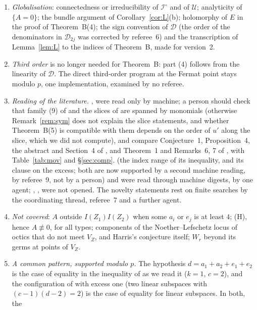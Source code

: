 \documentclass[11pt]{article}
\numberwithin{equation}{section}
\theoremstyle{remark}
\newcommand{\VZ}{V_Z}
\newcommand{\cD}{\mathcal{D}}
\newcommand{\cI}{\mathcal{I}}
\begin{document}
\begin{enumerate}[label=\textup{(\arabic*)}]
longer needed for $A\not\equiv0$, but the exact runs, the Lean certificate and all runs modulo $p$ depend on it.
No referee re-ran the exact programs or recompiled the Lean files.
\item \emph{Globalisation}: connectedness or irreducibility of $\cI^\circ$ and of $\mathcal U$; analyticity of
$\{A=0\}$; the bundle argument of Corollary~\ref{cor:L}(b); holomorphy of $E$ in the proof of Theorem~B(4); the
sign convention of $\cD$ (the order of the denominators in $\cD_{2j}$ was corrected by referee~6) and the
transcription of Lemma~\ref{lem:L} to the indices of Theorem~B, made for version~2.
\item \emph{Third order} is no longer needed for Theorem~B: part (4) follows from the linearity of $\cD$. The
direct third-order program at the Fermat point stays modulo $p$, one implementation, examined by no referee.
\item \emph{Reading of the literature.} \cite{Mo21}, \cite{Mo26} were read only by machine; a person should
check that family (9) of \cite{Mo21} and the slices of \cite{Mo26} are spanned by monomials (otherwise
Remark~\ref{rem:sym} does not explain the slice statements, and whether Theorem~B(5) is compatible with them
depends on the order of $u'$ along the slice, which we did not compute), and compare Conjecture~1, Proposition~4, the
abstract and Section~4 of \cite{Mo26}, and Theorem~1 and Remarks~6, 7 of \cite{Mo21}, with Table~\ref{tab:mov}
and \S\ref{sec:comp}. \cite[Thm~1.5]{Kl} (the index range of its inequality, and its clause on the excess; both
are now supported by a second machine reading, by referee~9, not by a person) and
\cite[\S5]{DFV} were read through machine digests, \cite{Kl2} by one agent; \cite{Mac}, \cite{Vo90},
\cite{Vo91} were not opened. The novelty statements rest on finite searches by the coordinating thread, referee~7
and a further agent.
\item \emph{Not covered}: $A$ outside $I(Z_1)I(Z_2)$ when some $a_i$ or $e_j$ is at least $4$; \textup{(H)},
hence $A\not\equiv0$, for all types; components of the Noether--Lefschetz locus of octics that do not meet
$\VZ$, and Harris's conjecture itself; $W_r$ beyond its germs at points of $\VZ$.
\item \emph{A common pattern, supported modulo $p$.} The hypothesis $d=a_1+a_2+e_1+e_2$ is the case of equality
in the inequality of \cite[Thm~1.5]{Kl} as we read it ($k=1$, $c=2$), and the configuration of \cite{P1} with
excess one (two linear subspaces with $(c-1)(d-2)=2$) is the case of equality for linear subspaces. In both, the

\end{enumerate}
\end{document}
